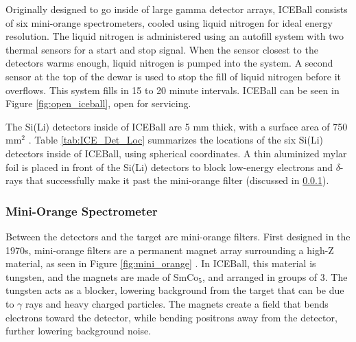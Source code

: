 Originally designed to go inside of large gamma detector arrays, ICEBall consists of six mini-orange spectrometers, cooled using liquid nitrogen for ideal energy resolution. The liquid nitrogen is administered using an autofill system with two thermal sensors for a start and stop signal. When the sensor closest to the detectors warms enough, liquid nitrogen is pumped into the system. A second sensor at the top of the dewar is used to stop the fill of liquid nitrogen before it overflows. This system fills in 15 to 20 minute intervals. ICEBall can be seen in Figure \ref{fig:open_iceball}, open for servicing.



The Si(Li) detectors inside of ICEBall are 5 mm thick, with a surface area of 750 mm$^2$ \citep{metlay93:_iceball_comm}. Table \ref{tab:ICE_Det_Loc} summarizes the locations of the six Si(Li) detectors inside of ICEBall, using spherical coordinates. A thin aluminized mylar foil is placed in front of the Si(Li) detectors to block low-energy electrons and $\delta$-rays that successfully make it past the mini-orange filter (discussed in \ref{sec:mini_orange}).



\subsubsection{Mini-Orange Spectrometer}
\label{sec:mini_orange}

Between the detectors and the target are mini-orange filters. First designed in the 1970s, mini-orange filters are a permanent magnet array surrounding a high-Z material, as seen in Figure \ref{fig:mini_orange} \citep{vanklinken72:mini_orange, vanklinken75:mini_orange}. In ICEBall, this material is tungsten, and the magnets are made of SmCo$_5$, and arranged in groups of 3. The tungsten acts as a blocker, lowering background from the target that can be due to $\gamma$ rays and heavy charged particles. The magnets create a field that bends electrons toward the detector, while bending positrons away from the detector, further lowering background noise. 



